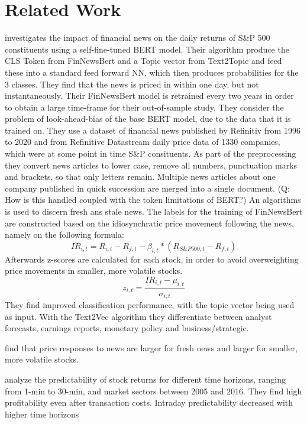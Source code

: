 \documentclass[12pt,a4paper]{article}
\begin{document}
	\section{Related Work}
	\textbf{\cite{salbrechter_financial_2021-1}} investigates the impact of financial news on the daily returns of S\&P 500 constituents using a self-fine-tuned BERT model. 
	Their algorithm produce the CLS Token from FinNewsBert and a Topic vector from Text2Topic and feed these into a standard feed forward NN, which then produces probabilities for the 3 classes.
	They find that the news is priced in within one day, but not instantaneously.
	Their FinNewsBert model is retrained every two years in order to obtain a large time-frame for their out-of-sample study.
	They consider the problem of look-ahead-bias of the base BERT model, due to the data that it is trained on.
	They use a dataset of financial news published by Refinitiv from 1996 to 2020 and from Refinitive Datastream daily price data of 1330 companies, which were at some point in time S\&P consituents.
	As part of the preprocessing they convert news articles to lower case, remove all numbers, punctuation marks and brackets, so that only letters remain.
	Multiple news articles about one company published in quick succession are merged into a single document.
	(Q: How is this handled coupled with the token limitations of BERT?)
	An algorithms is used to discern fresh ans stale news.
	The labels for the training of FinNewsBert are constructed based on the idiosynchratic price movement following the news,
	namely on the following formula: 
	$$I R_{i, t}=R_{i, t}-R_{f, t}-\beta_{i, t} *\left(R_{S \& P 500, t}-R_{f, t}\right)$$
	Afterwards z-scores are calculated for each stock, in order to avoid overweighting price movements in smaller, more volatile stocks.
	$$z_{i, t}=\frac{I R_{i, t}-\mu_{i, t}}{\sigma_{i, t}}$$
	They find improved classification performance, with the topic vector being used as input.
	With the Text2Vec algorithm they differentiate between analyst forecasts, earnings reports, monetary policy and business/strategic.
	
	\bigskip
	\textbf{\cite{ke_predicting_2020}} find that price responses to news are larger for fresh news and larger for smaller, more volatile stocks.
	
	
	
	\textbf{\cite{liu_intraday_2023}} analyze the predictability of stock returns for different time horizons, ranging from 1-min to 30-min, and market sectors between 2005 and 2016.
	They find high profitability even after transaction costs.
	Intraday predictability decreased with higher time horizons
	
\end{document}
